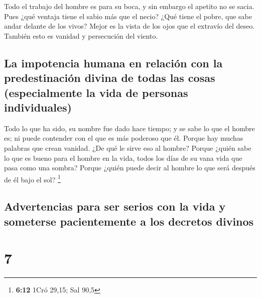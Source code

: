  Todo el trabajo del hombre es para su boca, y sin embargo
el apetito no se sacia.  Pues ¿qué ventaja tiene el sabio
más que el necio? ¿Qué tiene el pobre, que sabe andar delante de los
vivos?  Mejor es la vista de los ojos que el extravío del
deseo. También esto es vanidad y persecución del viento.

\hypertarget{la-impotencia-humana-en-relaciuxf3n-con-la-predestinaciuxf3n-divina-de-todas-las-cosas-especialmente-la-vida-de-personas-individuales}{%
\subsection{La impotencia humana en relación con la predestinación
divina de todas las cosas (especialmente la vida de personas
individuales)}\label{la-impotencia-humana-en-relaciuxf3n-con-la-predestinaciuxf3n-divina-de-todas-las-cosas-especialmente-la-vida-de-personas-individuales}}

 Todo lo que ha sido, su nombre fue dado hace tiempo; y
se sabe lo que el hombre es; ni puede contender con el que es más
poderoso que él.  Porque hay muchas palabras que crean
vanidad. ¿De qué le sirve eso al hombre?  Porque ¿quién
sabe lo que es bueno para el hombre en la vida, todos los días de su
vana vida que pasa como una sombra? Porque ¿quién puede decir al hombre
lo que será después de él bajo el sol? \footnote{\textbf{6:12} 1Cró
  29,15; Sal 90,5}

\hypertarget{advertencias-para-ser-serios-con-la-vida-y-someterse-pacientemente-a-los-decretos-divinos}{%
\subsection{Advertencias para ser serios con la vida y someterse
pacientemente a los decretos
divinos}\label{advertencias-para-ser-serios-con-la-vida-y-someterse-pacientemente-a-los-decretos-divinos}}

\hypertarget{section-6}{%
\section{7}\label{section-6}}

